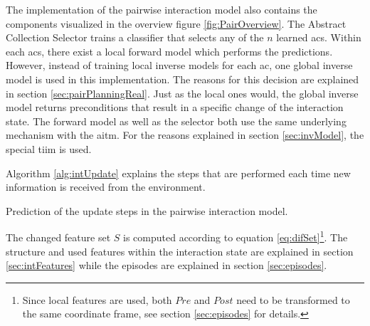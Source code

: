 The implementation of the pairwise interaction model also contains the components visualized in the overview figure \ref{fig:PairOverview}.
The Abstract Collection Selector trains a classifier that selects any of the $n$ learned \glspl{ac}. Within each \glspl{ac}, there exist a local forward model which performs the predictions.
However, instead of training local inverse models for each \gls{ac}, one global inverse model is used in this implementation. The reasons for this decision are explained in section \ref{sec:pairPlanningReal}.
Just as the local ones would, the global inverse model returns preconditions that result in a specific change of the interaction state.
The forward model as well as the selector both use the same underlying mechanism with the \gls{aitm}. For the reasons explained in section \ref{sec:invModel}, the special \gls{tiim} is used.

Algorithm \ref{alg:intUpdate} explains the steps that are performed each time new information is received from the environment.

\begin{algorithm}
	\BlankLine
	\caption{Prediction of the update steps in the pairwise interaction model.}
	\label{alg:intUpdate}
\end{algorithm}

The changed feature set $S$ is computed according to equation \ref{eq:difSet}\footnote{Since local features are used, both $Pre$ and $Post$ need to be transformed to the same coordinate frame, see section \ref{sec:episodes} for details.}. The structure and used features within the interaction state are explained in section \ref{sec:intFeatures} while the episodes are explained in section \ref{sec:episodes}.

